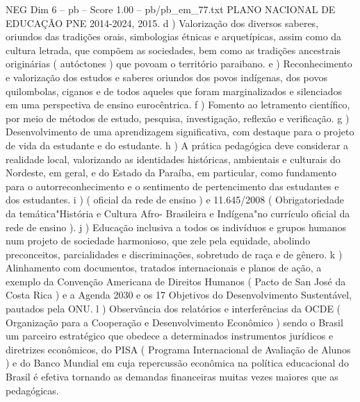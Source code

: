 \begin{textsample}{NEG Dim 6 – pb – Score 1.00 – pb/pb\_em\_77.txt}
PLANO NACIONAL DE EDUCAÇÃO PNE 2014-2024, 2015. d ) Valorização dos diversos saberes, oriundos das tradições orais, simbologias étnicas e arquetípicas, assim como da cultura letrada, que compõem as sociedades, bem como as tradições ancestrais originárias ( autóctones ) que povoam o território paraibano. e ) Reconhecimento e valorização dos estudos e saberes oriundos dos povos indígenas, dos povos quilombolas, ciganos e de todos aqueles que foram marginalizados e silenciados em uma perspectiva de ensino eurocêntrica. f ) Fomento ao letramento científico, por meio de métodos de estudo, pesquisa, investigação, reflexão e verificação. g ) Desenvolvimento de uma aprendizagem significativa, com destaque para o projeto de vida da estudante e do estudante. h ) A prática pedagógica deve considerar a realidade local, valorizando as identidades históricas, ambientais e culturais do Nordeste, em geral, e do Estado da Paraíba, em particular, como fundamento para o autorreconhecimento e o sentimento de pertencimento das estudantes e dos estudantes. i ) ( oficial da rede de ensino ) e 11.645/2008 ( Obrigatoriedade da temática"História e Cultura Afro- Brasileira e Indígena"no currículo oficial da rede de ensino ). j ) Educação inclusiva a todos os indivíduos e grupos humanos num projeto de sociedade harmonioso, que zele pela equidade, abolindo preconceitos, parcialidades e discriminações, sobretudo de raça e de gênero. k ) Alinhamento com documentos, tratados internacionais e planos de ação, a exemplo da Convenção Americana de Direitos Humanos ( Pacto de San José da Costa Rica ) e a Agenda 2030 e os 17 Objetivos do Desenvolvimento Sustentável, pautados pela ONU. l ) Observância dos relatórios e interferências da OCDE ( Organização para a Cooperação e Desenvolvimento Econômico ) sendo o Brasil um parceiro estratégico que obedece a determinados instrumentos jurídicos e diretrizes econômicos, do PISA ( Programa Internacional de Avaliação de Alunos ) e do Banco Mundial em cuja repercussão econômica na política educacional do Brasil é efetiva tornando as demandas financeiras muitas vezes maiores que as pedagógicas.

\end{textsample}
